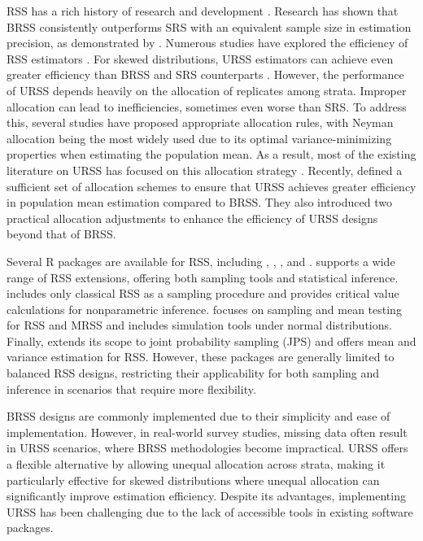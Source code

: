 RSS has a rich history of research and development \citep[][and references therein]{ChenBS:2006,Wolfe:2012}. Research has shown that BRSS consistently outperforms SRS with an equivalent sample size in estimation precision, as demonstrated by \cite{Takahashi:1968}. Numerous studies have explored the efficiency of RSS estimators \citep[]{dell1972ranked,david1972ranked,stokes1980inferences}. For skewed distributions, URSS estimators can achieve even greater efficiency than BRSS and SRS counterparts \citep{ahn2017unbalanced, Ahn:2024, bocci2010ranked, Chen:2000, Ozturk:2004}. However, the performance of URSS depends heavily on the allocation of replicates among strata. Improper allocation can lead to inefficiencies, sometimes even worse than SRS. To address this, several studies \citep{bhoj2020simple, Chen:2000,mcintyre1952method,Wang:2004} have proposed appropriate allocation rules, with Neyman allocation being the most widely used due to its optimal variance-minimizing properties when estimating the population mean. As a result, most of the existing literature on URSS has focused on this allocation strategy \citep{ChenBS:2006,Takahashi:1968,wang2017unbalanced}. Recently, \cite{Ahn:2022} defined a sufficient set of allocation schemes to ensure that URSS achieves greater efficiency in population mean estimation compared to BRSS. They also introduced two practical allocation adjustments to enhance the efficiency of URSS designs beyond that of BRSS.

Several R packages are available for RSS, including  \citep{RSSampling},  \citep{NSM3},  \citep{RSStest}, and  \citep{RankedSetSampling}.  supports a wide range of RSS extensions, offering both sampling tools and statistical inference.  includes only classical RSS as a sampling procedure and provides critical value calculations for nonparametric inference.  focuses on sampling and mean testing for RSS and MRSS and includes simulation tools under normal distributions. Finally,  extends its scope to joint probability sampling (JPS) and offers mean and variance estimation for RSS.
However, these packages are generally limited to balanced RSS designs, restricting their applicability for both sampling and inference in scenarios that require more flexibility.

BRSS designs are commonly implemented due to their simplicity and ease of implementation. However, in real-world survey studies, missing data often result in URSS scenarios, where BRSS methodologies become impractical. URSS offers a flexible alternative by allowing unequal allocation across strata, making it particularly effective for skewed distributions where unequal allocation can significantly improve estimation efficiency. Despite its advantages, implementing URSS has been challenging due to the lack of accessible tools in existing software packages.

